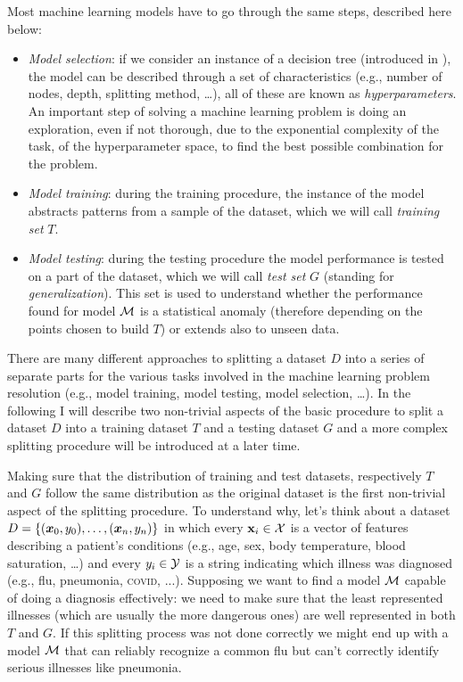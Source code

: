 Most machine learning models have to go through the same steps, described here below:
\begin{itemize}
	\item \emph{Model selection}: if we consider an instance of a decision tree (introduced in
	      ), the model can be described through a set of characteristics (e.g.,
	      number of nodes, depth, splitting method, \ldots), all of these are known as
	      \emph{hyperparameters}. An important step of solving a machine learning problem is
	      doing an exploration, even if not thorough, due to the exponential complexity of the
	      task, of the hyperparameter space, to find the best possible combination for the
	      problem.
	\item \emph{Model training}: during the training procedure, the instance of the model abstracts
	      patterns from a sample of the dataset, which we will call \emph{training set} $T$.
	\item \emph{Model testing}: during the testing procedure the model performance is tested on a
	      part of the dataset, which we will call \emph{test set} $G$ (standing for
	      \emph{generalization}). This set is used to understand whether the performance found for model
	      $\mathcal{M}$ is a statistical anomaly (therefore depending on the points
	      chosen to build $T$) or extends also to unseen data.
\end{itemize}

There are many different approaches to splitting a dataset $D$ into a series of separate parts
for the various tasks involved in the machine learning problem resolution (e.g., model training,
model testing, model selection, \ldots). In the following I will describe two non-trivial aspects of
the basic procedure to split a dataset $D$ into a training dataset $T$ and a testing dataset $G$ and a
more complex splitting procedure will be introduced at a later time.

\medskip

Making sure that the distribution of training and test datasets, respectively $T$ and $G$ follow the
same distribution as the original dataset is the first non-trivial aspect of the splitting
procedure. To understand why, let's think about a dataset
$D = \{(\boldsymbol{x}_0, y_0), \ldots, (\boldsymbol{x}_n, y_n)\}$ in which every $\mathbf{x}_i \in \mathcal{X}$ is a vector of features describing a patient's
conditions (e.g., age, sex, body temperature, blood saturation, \ldots) and every $y_i \in \mathcal{Y}$ is
a string indicating which illness was diagnosed (e.g., flu, pneumonia, \textsc{covid}, ...). Supposing we want to find a
model $\mathcal{M}$ capable of doing a diagnosis effectively: we need to make sure that the least
represented illnesses (which are usually the more dangerous ones) are well represented in both $T$
and $G$. If this splitting process was not done correctly we might end up with a model $\mathcal{M}$ that
can reliably recognize a common flu but can't correctly identify serious illnesses like pneumonia.


